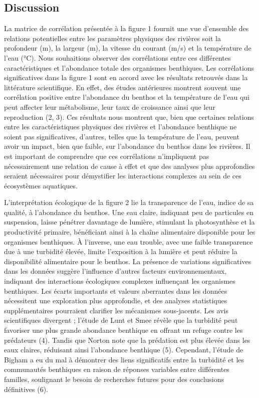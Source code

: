 \documentclass[9pt,twocolumn,twoside,]{pnas-new}
\begin{document}
\hypertarget{Discussion}{%
\subsection*{Discussion}\label{Discussion}}

La matrice de corrélation présentée à la figure 1 fournit une vue
d'ensemble des relations potentielles entre les paramètres physiques des
rivières soit la profondeur (m), la largeur (m), la vitesse du courant
(m/s) et la température de l'eau (°C). Nous souhaitions observer des
corrélations entre ces différentes caractéristiques et l'abondance
totale des organismes benthiques. Les corrélations significatives dans
la figure 1 sont en accord avec les résultats retrouvés dans la
littérature scientifique. En effet, des études antérieures montrent
souvent une corrélation positive entre l'abondance du benthos et la
température de l'eau qui peut affecter leur métabolisme, leur taux de
croissance ainsi que leur reproduction (2, 3). Ces résultats nous
montrent que, bien que certaines relations entre les caractéristiques
physiques des rivières et l'abondance benthique ne soient pas
significatives, d'autres, telles que la température de l'eau, peuvent
avoir un impact, bien que faible, sur l'abondance du benthos dans les
rivières. Il est important de comprendre que ces corrélations
n'impliquent pas nécessairement une relation de cause à effet et que des
analyses plus approfondies seraient nécessaires pour démystifier les
interactions complexes au sein de ces écosystèmes aquatiques.

L'interprétation écologique de la figure 2 lie la transparence de l'eau,
indice de sa qualité, à l'abondance du benthos. Une eau claire,
indiquant peu de particules en suspension, laisse pénétrer davantage de
lumière, stimulant la photosynthèse et la productivité primaire,
bénéficiant ainsi à la chaîne alimentaire disponible pour les organismes
benthiques. À l'inverse, une eau trouble, avec une faible transparence
due à une turbidité élevée, limite l'exposition à la lumière et peut
réduire la disponibilité alimentaire pour le benthos. La présence de
variations significatives dans les données suggère l'influence d'autres
facteurs environnementaux, indiquant des interactions écologiques
complexes influençant les organismes benthiques. Les écarts importants
et valeurs aberrantes dans les données nécessitent une exploration plus
approfondie, et des analyses statistiques supplémentaires pourraient
clarifier les mécanismes sous-jacents. Les avis scientifiques divergent
; l'étude de Lunt et Smee révèle que la turbidité peut favoriser une
plus grande abondance benthique en offrant un refuge contre les
prédateurs (4). Tandis que Norton note que la prédation est plus élevée
dans les eaux claires, réduisant ainsi l'abondance benthique (5).
Cependant, l'étude de Bigham a eu du mal à démontrer des liens
significatifs entre la turbidité et les communautés benthiques en raison
de réponses variables entre différentes familles, soulignant le besoin
de recherches futures pour des conclusions définitives (6).
\end{document}
